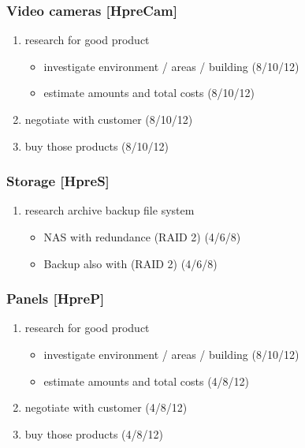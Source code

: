 \subsubsection*{Video cameras [HpreCam]}
\label{sec:org3a27049}
	\begin{enumerate}
	\item research for good product
	\begin{itemize}
	\item investigate environment / areas / building (8/10/12)
	\item estimate amounts and total costs (8/10/12)
	\end{itemize}
	\item negotiate with customer (8/10/12)
	\item buy those products (8/10/12)
	\end{enumerate}

\subsubsection*{Storage [HpreS]}
\label{sec:orgeb93f9e}
\begin{enumerate}
\item research archive backup file system
\begin{itemize}
\item NAS with redundance (RAID 2) (4/6/8)
\item Backup also with (RAID 2) (4/6/8)
\end{itemize}
\end{enumerate}

\subsubsection*{Panels [HpreP]}
\label{sec:org4b41c6c}
\begin{enumerate}
\item research for good product
\begin{itemize}
\item investigate environment / areas / building (8/10/12)
\item estimate amounts and total costs (4/8/12)
\end{itemize}
\item negotiate with customer (4/8/12)
\item buy those products (4/8/12)
\end{enumerate}

